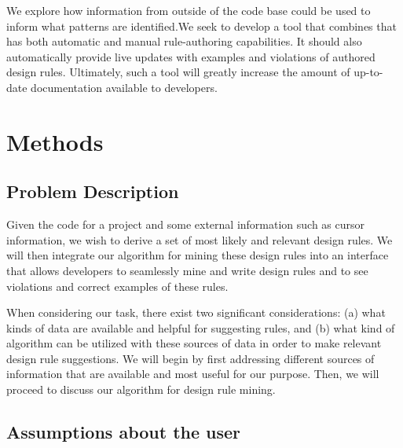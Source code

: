 \documentclass[12pt]{article}
\begin{document}
We explore how information from outside of the code base could be used to inform what patterns are identified.We seek to develop a tool that combines that has both automatic and manual rule-authoring capabilities. It should also automatically provide live updates with examples and violations of authored design rules. Ultimately, such a tool will greatly increase the amount of up-to-date documentation available to developers.
 
 
 \clearpage


\section{Methods}\label{methods}

\subsection{Problem Description} \label{probDesc}

Given the code for a project and some external information such as cursor information, we wish to derive a set of most likely and relevant design rules. We will then integrate our algorithm for mining these design rules into an interface that allows developers to seamlessly mine and write design rules and to see violations and correct examples of these rules. 

When considering our task, there exist two significant considerations: (a) what kinds of data are available and helpful for suggesting rules, and (b) what kind of algorithm can be utilized with these sources of data in order to make relevant design rule suggestions. We will begin by first addressing different sources of information that are available and most useful for our purpose. Then, we will proceed to discuss our algorithm for design rule mining.


\subsection{Assumptions about the user} \label{assumptions}
\end{document}
